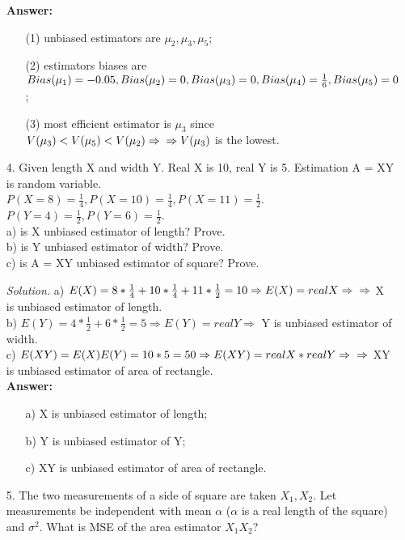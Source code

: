 \documentclass[12pt]{article}
\begin{document}
\begin{itemize}
\textbf{Answer:} 
\begin{itemize}
\item[(1)] unbiased estimators are $\mu_2, \mu_3, \mu_5$; 
\item[(2)] estimators biases are $Bias(\mu_1) = -0.05, Bias(\mu_2) = 0,\\ Bias(\mu_3) = 0, Bias(\mu_4) = \frac{1}{6}, Bias(\mu_5) = 0$; 
\item[(3)] most efficient estimator is $\mu_3$ since $V(\mu_3) < V(\mu_5) < V(\mu_2) \Rightarrow \\ \Rightarrow V(\mu_3)$ is the lowest.
\end{itemize}

\item[4.]
Given length X and width Y. Real X is 10, real Y is 5. Estimation A = XY is random variable. \\
$P(X=8) = \frac{1}{4}, P(X=10) = \frac{1}{4}, P(X=11) = \frac{1}{2}$. \\
$P(Y=4) = \frac{1}{2}, P(Y=6) = \frac{1}{2}$. \\
a) is X unbiased estimator of length? Prove. \\
b) is Y unbiased estimator of width? Prove. \\
c) is A = XY unbiased estimator of square? Prove. 

\textit{Solution.} a) $E(X) = 8*\frac{1}{4} + 10*\frac{1}{4} + 11*\frac{1}{2} = 10 \Rightarrow E(X) = real X \Rightarrow\\
\Rightarrow$ X is unbiased estimator of length. \\
b) $E(Y) = 4*\frac{1}{2} + 6*\frac{1}{2} = 5 \Rightarrow E(Y) = real Y \Rightarrow$ Y is unbiased estimator of width. \\
c) $E(XY) = E(X) E(Y) = 10 * 5 = 50 \Rightarrow E(XY) = real X * real Y \Rightarrow\\
\Rightarrow$ XY is unbiased estimator of area of rectangle. \\

\textbf{Answer:} 
\begin{itemize}
\item[a)] X is unbiased estimator of length; 
\item[b)] Y is unbiased estimator of Y; 
\item[c)] XY is unbiased estimator of area of rectangle.
\end{itemize}

\item[5.]
The two measurements of a side of square are taken $X_1, X_2$. Let measurements be independent with mean $\alpha$ ($\alpha$ is a real length of the square) and $\sigma^2$. What is MSE of the area estimator $X_1 X_2$?


\end{itemize}
\end{document}
